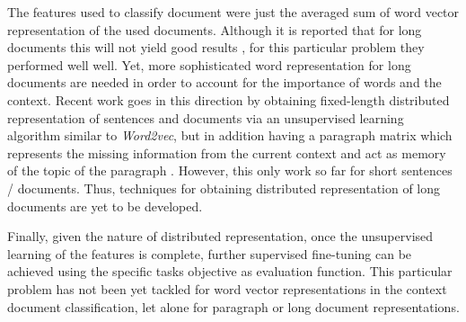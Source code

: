 The features used to classify document were
just the averaged sum of word vector representation of the used documents.
Although it is reported that for long documents this will not yield good
results \cite{MikolovSCCD13},  for this particular problem they performed well 
well. Yet, more sophisticated word representation for long documents are needed in
order to account for the importance of words and the context.
 Recent work goes in this direction by obtaining 
fixed-length distributed representation of sentences and documents via an
unsupervised learning algorithm similar to \textit{Word2vec}, but in addition
having a paragraph matrix which represents the missing information from the
current context and act as memory of the topic of the paragraph
\cite{2014arXiv1405.4053L}. However, this only work so far for short
sentences / documents. Thus, techniques for obtaining distributed
representation of long documents are yet to be developed. 

Finally, given the nature of distributed representation, once the
unsupervised learning of the features is complete, further supervised fine-tuning can be
achieved using the specific tasks objective as evaluation function. This
particular problem has not been yet tackled for  word vector representations
in the context document classification, let alone for paragraph or long document representations.



 

